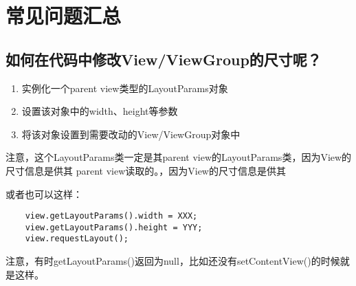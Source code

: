 ﻿\documentclass[a4paper]{article}
\begin{document}
  \section[常见问题汇总]{常见问题汇总}
  \subsection[动态修改尺寸]{如何在代码中修改View/ViewGroup的尺寸呢？}
  \begin{enumerate}
    \item 实例化一个parent view类型的LayoutParams对象
    \item 设置该对象中的width、height等参数
    \item 将该对象设置到需要改动的View/ViewGroup对象中
  \end{enumerate}
  注意，这个LayoutParams类一定是其parent view的LayoutParams类，因为View的尺寸信息是供其
  parent view读取的。，因为View的尺寸信息是供其


  或者也可以这样：
  \begin{verbatim}
    view.getLayoutParams().width = XXX;
    view.getLayoutParams().height = YYY;
    view.requestLayout();
  \end{verbatim}
  注意，有时getLayoutParams()返回为null，比如还没有setContentView()的时候就是这样。

\end{document}
